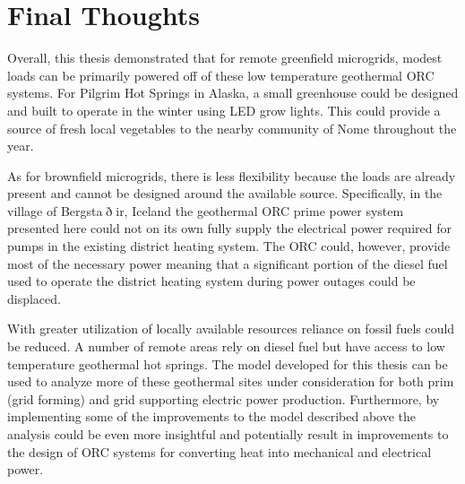 \section{Final Thoughts}
Overall, this thesis demonstrated that for remote greenfield microgrids, modest loads can be primarily powered off of these low temperature geothermal ORC systems. For Pilgrim Hot Springs in Alaska, a small greenhouse could be designed and built to operate in the winter using LED grow lights. This could provide a source of fresh local vegetables to the nearby community of Nome throughout the year. 

As for brownfield microgrids, there is less flexibility because the loads are already present and cannot be designed around the available source. Specifically, in the village of Bergsta$\eth$ir, Iceland the geothermal ORC prime power system presented here could not on its own fully supply the electrical power required for pumps in the existing district heating system. The ORC could, however, provide most of the necessary power meaning that a significant portion of the diesel fuel used to operate the district heating system during power outages could be displaced.

With greater utilization of locally available resources reliance on fossil fuels could be reduced. A number of remote areas rely on diesel fuel but have access to low temperature geothermal hot springs. The model developed for this thesis can be used to analyze more of these geothermal sites under consideration for both prim (grid forming) and grid supporting electric power production. Furthermore, by implementing some of the improvements to the model described above the analysis could be even more insightful and potentially result in improvements to the design of ORC systems for converting heat into mechanical and electrical power.

\cleardoublepage

